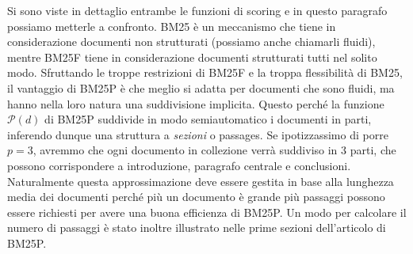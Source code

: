  Si sono viste in dettaglio entrambe le funzioni di scoring e in questo paragrafo possiamo metterle a confronto.
 BM25 è un meccanismo che tiene in considerazione documenti non strutturati (possiamo anche chiamarli fluidi),
 mentre BM25F tiene in considerazione documenti strutturati tutti nel solito modo.
 Sfruttando le troppe restrizioni di BM25F e la troppa flessibilità di BM25, il vantaggio di BM25P è che meglio
 si adatta per documenti che sono fluidi, ma hanno nella loro natura una suddivisione implicita.
Questo perché la funzione $\mathcal{P}(d)$ di  BM25P suddivide in modo semiautomatico
 i documenti in parti, inferendo dunque una struttura a \textit{sezioni} o passages.
 Se ipotizzassimo di porre $p=3$,
 avremmo che ogni documento in collezione verrà suddiviso in 3 parti, che possono corrispondere
 a introduzione, paragrafo centrale e conclusioni. Naturalmente questa approssimazione deve essere
 gestita in base alla lunghezza media dei documenti perché più un documento è grande più passaggi possono
 essere richiesti per avere una buona efficienza di BM25P. Un modo per calcolare il numero di passaggi è
 stato inoltre illustrato nelle prime sezioni dell'articolo di BM25P\cite{10.1145/3331184.3331373}.
 
